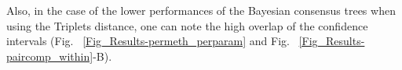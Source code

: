 \documentclass[12pt,letterpaper]{article}
\begin{document}
Also, in the case of the lower performances of the Bayesian consensus trees when using the Triplets distance, one can note the high overlap of the confidence intervals (Fig. ~\ref{Fig_Results-permeth_perparam} and Fig. ~\ref{Fig_Results-paircomp_within}-B). %

\end{document}
